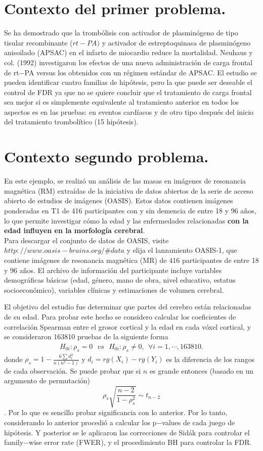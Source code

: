 \documentclass[11pt,letterpaper]{article}
\begin{document}
\section{Contexto del primer problema.}
Se ha demostrado que la trombólisis con activador de plasminógeno de tipo tisular recombinante ($rt-PA)$ y activador de estreptoquinasa de plasminógeno anisoilado (APSAC) en el infarto de miocardio reduce la mortalidad. Neuhaus y col. (1992) investigaron los efectos de una nueva administración de carga frontal de rt$-$PA versus los obtenidos con un régimen estándar de APSAC. El estudio se pueden identificar cuatro familias de hipótesis, pero la que puede ser deseable el control de FDR ya que no se quiere concluir que el tratamiento de carga frontal sea mejor si es simplemente equivalente al tratamiento anterior en todos los aspectos es en las pruebas: en eventos cardíacos y de otro tipo después del inicio del tratamiento trombolítico (15 hipótesis).

\section{Contexto segundo problema.}
En este ejemplo, se realizó un análisis de las masas en imágenes de resonancia magnética (RM) extraídas de la iniciativa de datos abiertos de la serie de acceso abierto de estudios de imágenes (OASIS). Estos datos contienen imágenes ponderadas en T1 de 416 participantes con y sin demencia de entre 18 y 96 años, lo que permite investigar cómo la edad y las enfermedades relacionadas \textbf{con la edad influyen en la morfología cerebral}.\\

Para descargar el conjunto de datos de OASIS, visite $http://www.oasis-brains.org/\#data$ y elija el lanzamiento OASIS-1, que contiene imágenes de resonancia magnética (MR) de 416 participantes de entre 18 y 96 años. El archivo de información del participante incluye variables demográficas básicas (edad, género, mano de obra, nivel educativo, estatus socioeconómico), variables clínicas y estimaciones de volumen cerebral. 

El objetivo del estudio fue determinar que partes del cerebro están relacionadas de su edad. Para probar este hecho se considero calcular los coeficientes de correlación Spearman  entre el grosor cortical y la edad en cada vóxel cortical, y se consideraron 163810 pruebas de la siguiente forma
\begin{align*}
H_{0i}: \rho_s =0 \ \ \ vs \ \ \ H_{0i}:\rho_s\neq 0, \ \ \forall i=1,\cdots, 163810.
\end{align*}
donde $\rho_s=1-\frac{6\sum d_i^2}{n(n^2-1)}$ y $d_i=rg(X_i)-rg(Y_i)$ es la diferencia de los rangos de cada observación. Se puede probar que si $n$ es grande entonces (basado en un argumento de permutación) 
$$\rho_s\sqrt{\frac{n-2}{1-\rho_s^2}} \sim t_{n-2}$$.
Por lo que es sencillo probar significancia con lo anterior. Por lo tanto, considerando lo anterior procedió a calcular los p$-$values de cada juego de hipótesis. Y posterior se le aplicaron las correcciones de Sidák para controlar el family$-$wise error rate (FWER), y el procedimiento BH para controlar la FDR. 
\end{document}
